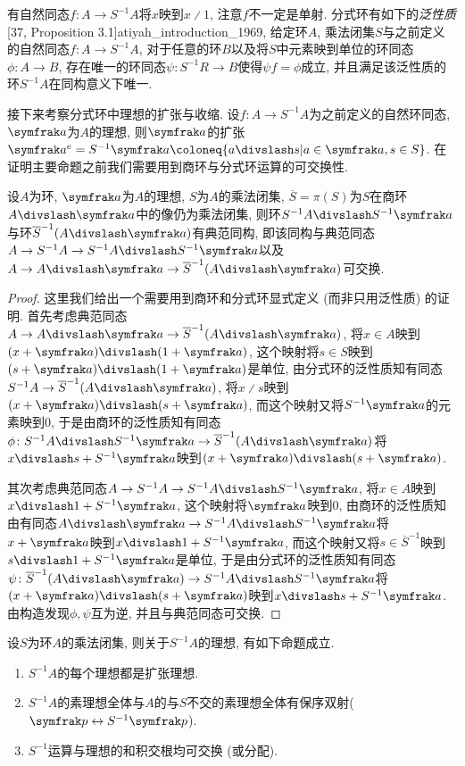 有自然同态$f\colon A\to S^{-1}A$将$x$映到$x{\divslash}1$, 注意$f$不一定是单射. 分式环有如下的\emph{泛性质}[37, Proposition 3.1]{atiyah_introduction_1969}, 给定环$A$, 乘法闭集$S$与之前定义的自然同态$f\colon A\to S^{-1}A$, 对于任意的环$B$以及将$S$中元素映到单位的环同态$\phi\colon A\to B$, 存在唯一的环同态$\psi\colon S^{-1}R\to B$使得$\psi f=\phi$成立, 并且满足该泛性质的环$S^{-1}A$在同构意义下唯一.

接下来考察分式环中理想的扩张与收缩. 设$f\colon A\to S^{-1}A$为之前定义的自然环同态, $\ideal{a}$为$A$的理想, 则$\ideal{a}$的扩张$\ideal{a}^e=S^{-1}\ideal{a}\coloneq \{a{\divslash}s\vert a\in\ideal{a}, s\in S\}$. 在证明主要命题之前我们需要用到商环与分式环运算的可交换性.

\begin{proposition}\label{prop:localizationquotientcommute}
  设$A$为环, $\ideal{a}$为$A$的理想, $S$为$A$的乘法闭集, $\overline{S}=\pi(S)$为$S$在商环$A{\divslash}\ideal{a}$中的像仍为乘法闭集, 则环$\SASa$与环$\SAa$有典范同构, 即该同构与典范同态$A\to S^{-1}A\to \SASa$以及$A\to A{\divslash}\ideal{a}\to \SAa$可交换.
\end{proposition}

\begin{proof}
  这里我们给出一个需要用到商环和分式环显式定义 (而非只用泛性质) 的证明. 首先考虑典范同态$A\to A{\divslash}\ideal{a}\to \SAa$, 将$x\in A$映到$(x+\ideal{a}){\divslash}(1+\ideal{a})$, 这个映射将$s\in S$映到$(s+\ideal{a}){\divslash}(1+\ideal{a})$是单位, 由分式环的泛性质知有同态$S^{-1}A\to \SAa$, 将$x{\divslash}s$映到$(x+\ideal{a}){\divslash}(s+\ideal{a})$, 而这个映射又将$S^{-1}\ideal{a}$的元素映到0, 于是由商环的泛性质知有同态$\phi\colon\SASa\to\SAa$将$x{\divslash}s + S^{-1}\ideal{a}$映到$(x+\ideal{a}){\divslash}(s+\ideal{a})$.

  其次考虑典范同态$A\to S^{-1}A\to\SASa$, 将$x\in A$映到$x{\divslash}1+S^{-1}\ideal{a}$, 这个映射将$\ideal{a}$映到0, 由商环的泛性质知由有同态$A{\divslash}\ideal{a}\to\SASa$将$x+\ideal{a}$映到$x{\divslash}1+S^{-1}\ideal{a}$, 而这个映射又将$s\in\overline{S}^{-1}$映到$s{\divslash}1+S^{-1}\ideal{a}$是单位, 于是由分式环的泛性质知有同态$\psi\colon\SAa\to\SASa$将$(x+\ideal{a}){\divslash}(s+\ideal{a})$映到$x{\divslash}s + S^{-1}\ideal{a}$. 由构造发现$\phi, \psi$互为逆, 并且与典范同态可交换.
\end{proof}

\begin{proposition}\label{prop:fracideal}
  设$S$为环$A$的乘法闭集, 则关于$S^{-1}A$的理想, 有如下命题成立.
  \begin{enumerate}
    \item\label{enum:prop-fracideal-1} $S^{-1}A$的每个理想都是扩张理想.
    \item\label{enum:prop-fracideal-2} $S^{-1}A$的素理想全体与$A$的与$S$不交的素理想全体有保序双射($\ideal{p}\leftrightarrow S^{-1}\ideal{p}$).
    \item\label{enum:prop-fracideal-3} $S^{-1}$运算与理想的和积交根均可交换 (或分配). %
  \end{enumerate}
\end{proposition}

